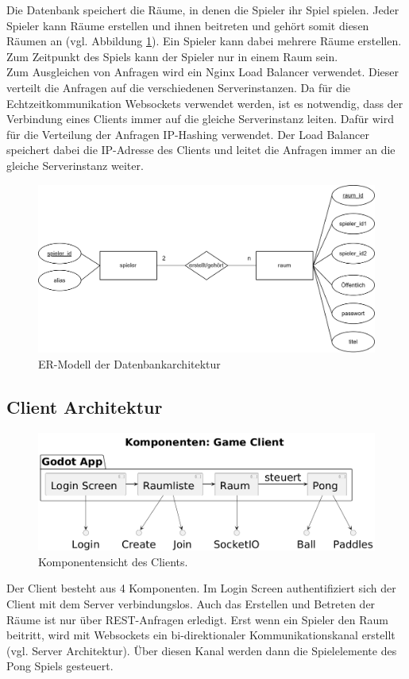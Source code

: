 \documentclass[
]{article}
\begin{document}
Die Datenbank speichert die Räume, in denen die Spieler ihr Spiel spielen. 
Jeder Spieler kann Räume erstellen und ihnen beitreten und gehört somit diesen 
Räumen an (vgl. Abbildung \ref{fig:ER-Modell}).
Ein Spieler kann dabei mehrere Räume erstellen.
Zum Zeitpunkt des Spiels kann der Spieler nur in einem Raum sein.
\\Zum Ausgleichen von Anfragen wird ein Nginx Load Balancer verwendet.
Dieser verteilt die Anfragen auf die verschiedenen Serverinstanzen.
Da für die Echtzeitkommunikation Websockets verwendet werden, ist es notwendig,
dass der Verbindung eines Clients immer auf die gleiche Serverinstanz leiten.
Dafür wird für die Verteilung der Anfragen IP-Hashing verwendet.
Der Load Balancer speichert dabei die IP-Adresse des Clients und 
leitet die Anfragen immer an die gleiche Serverinstanz weiter.

\begin{figure}[H]
	\centering
	\includegraphics[width=\textwidth ]{resources/ER-Modell.png}
	\caption{ER-Modell der Datenbankarchitektur}
	\label{fig:ER-Modell}
\end{figure}

\subsection{Client Architektur}
\begin{figure}[H]
	\centering
	\includegraphics[width=\textwidth -80pt ]{resources/Client-Architektur.png}
	\caption{Komponentensicht des Clients.}
	\label{fig:clientarchitektur}
\end{figure}
Der Client besteht aus 4 Komponenten. Im Login Screen authentifiziert sich der Client mit dem Server verbindungslos. Auch das Erstellen und Betreten der Räume ist nur über REST-Anfragen erledigt. Erst wenn ein Spieler den Raum beitritt, wird mit Websockets ein bi-direktionaler Kommunikationskanal erstellt (vgl. Server Architektur). Über diesen Kanal werden dann die Spielelemente des Pong Spiels gesteuert. 
\end{document}
